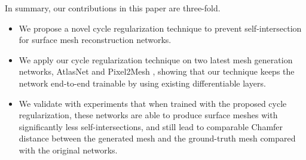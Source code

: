 In summary, our contributions in this paper are three-fold.
\begin{itemize}
	\item We propose a novel cycle regularization technique to prevent self-intersection for surface mesh reconstruction networks. 
	\item We apply our cycle regularization technique on two latest mesh generation networks, AtlasNet \cite{atlasnet} and Pixel2Mesh \cite{pixel2mesh}, showing that our technique keeps the network end-to-end trainable by using existing differentiable layers.
	\item We validate with experiments that when trained with the proposed cycle regularization, these networks are able to produce surface meshes with significantly less self-intersections, and still lead to comparable Chamfer distance between the generated mesh and the ground-truth mesh compared with the original networks. 
\end{itemize}

 